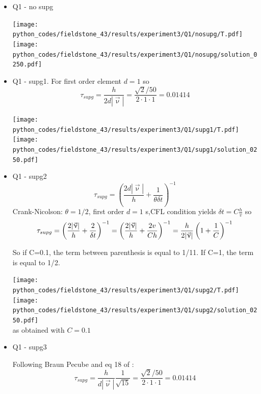 \begin{itemize}
\item Q1 - no supg  %


\begin{center}
\texttt{[image: python\_codes/fieldstone\_43/results/experiment3/Q1/nosupg/T.pdf]}
\texttt{[image: python\_codes/fieldstone\_43/results/experiment3/Q1/nosupg/solution\_0250.pdf]}
\end{center}

\item Q1 - supg1. For first order element $d=1$ so
\[
\tau_{supg} = \frac{h}{2 d |\vec{\upnu}|} = \frac{\sqrt{2}/50}{2 \cdot 1 \cdot 1} = 0.01414
\]

\begin{center}
\texttt{[image: python\_codes/fieldstone\_43/results/experiment3/Q1/supg1/T.pdf]}
\texttt{[image: python\_codes/fieldstone\_43/results/experiment3/Q1/supg1/solution\_0250.pdf]}
\end{center}


\item Q1 - supg2 %
\[
\tau_{supg} = \left( \frac{2 d |\vec{\upnu}|}{h} + \frac{1}{\theta \delta t}  \right)^{-1}  
\]
Crank-Nicolson: $\theta=1/2$, first order $d=1$ s,CFL condition yields $\delta t = C \frac{h}{v}$ so 
\[
\tau_{supg} = \left( \frac{2 |\vec{\upnu}|}{h} + \frac{2}{\delta t}  \right)^{-1}  
= \left( \frac{2 |\vec{\upnu}|}{h} + \frac{2 v}{C h}  \right)^{-1}  
= \frac{h}{2 |\vec{\upnu}|}  \left( 1 + \frac{1}{C}  \right)^{-1} \nonumber 
\]

So if C=0.1, the term between parenthesis is equal to 1/11. If C=1, the term is equal to 1/2.

\begin{center}
\texttt{[image: python\_codes/fieldstone\_43/results/experiment3/Q1/supg2/T.pdf]}
\texttt{[image: python\_codes/fieldstone\_43/results/experiment3/Q1/supg2/solution\_0250.pdf]}\\
as obtained with $C=0.1$
\end{center}


\item Q1 - supg3 %

Following Braun Pecube and eq 18 of \cite{bogs04}:
\[
\tau_{supg} = \frac{h}{d |\vec{\upnu}|} \frac{1}{\sqrt{15}} = \frac{\sqrt{2}/50}{2 \cdot 1 \cdot 1} = 0.01414
\]


\end{itemize}
